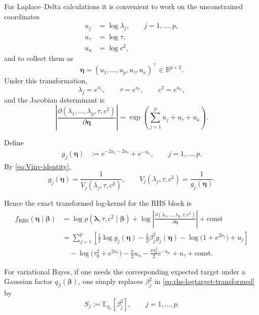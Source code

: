 \documentclass[11pt]{article}
\newcommand{\vect}[1]{\boldsymbol{#1}}
\newcommand{\E}{\mathbb{E}}
\newcommand{\R}{\mathbb{R}}
\begin{document}
For Laplace--Delta calculations it is convenient to work on the unconstrained coordinates
\begin{align}
  u_j &= \log \lambda_j, \qquad j=1,\dots,p,\\
  u_\tau &= \log \tau,\\
  u_\kappa &= \log c^2,
\end{align}
and to collect them as
\[
  \vect{\eta}
  =
  (u_1,\dots,u_p,u_\tau,u_\kappa)^\top \in \R^{p+2}.
\]
Under this transformation,
\begin{equation}
  \lambda_j = e^{u_j},
  \qquad
  \tau = e^{u_\tau},
  \qquad
  c^2 = e^{u_\kappa},
\end{equation}
and the Jacobian determinant is
\begin{equation}
  \left|
    \frac{\partial(\lambda_1,\dots,\lambda_p,\tau,c^2)}{\partial \vect{\eta}}
  \right|
  =
  \exp\!\left(\sum_{j=1}^p u_j + u_\tau + u_\kappa\right).
\end{equation}

Define
\begin{align}
  g_j(\vect{\eta})
  &:=
  e^{-2u_j-2u_\tau} + e^{-u_\kappa},
  \qquad j=1,\dots,p.
\end{align}
By \eqref{eq:Vinv-identity},
\begin{equation}
  g_j(\vect{\eta})
  =
  \frac{1}{V_j(\lambda_j,\tau,c^2)},
  \qquad
  V_j(\lambda_j,\tau,c^2)=\frac{1}{g_j(\vect{\eta})}.
\end{equation}

Hence the exact transformed log-kernel for the RHS block is
\begin{align}
  f_{\mathrm{RHS}}(\vect{\eta}\mid \vect{\beta})
  &=
  \log p(\vect{\lambda},\tau,c^2\mid \vect{\beta})
  +
  \log\left|
    \frac{\partial(\lambda_1,\dots,\lambda_p,\tau,c^2)}{\partial \vect{\eta}}
  \right|
  + \text{const}
  \nonumber\\
  &=
  \sum_{j=1}^p
  \left[
    \frac{1}{2}\log g_j(\vect{\eta})
    - \frac{1}{2}\beta_j^2 g_j(\vect{\eta})
    - \log\!\big(1+e^{2u_j}\big)
    + u_j
  \right]
  \nonumber\\
  &\quad
  - \log\!\big(\tau_0^2 + e^{2u_\tau}\big)
  - \frac{\nu}{2}u_\kappa
  - \frac{\nu s_0^2}{2}e^{-u_\kappa}
  + u_\tau
  + \text{const}.
  \label{eq:rhs-logtarget-transformed}
\end{align}

For variational Bayes, if one needs the corresponding expected target under a Gaussian
factor $q_\beta(\vect{\beta})$, one simply replaces $\beta_j^2$ in
\eqref{eq:rhs-logtarget-transformed} by
\begin{equation}
  S_j := \E_{q_\beta}[\beta_j^2],
  \qquad j=1,\dots,p.
\end{equation}
\end{document}
